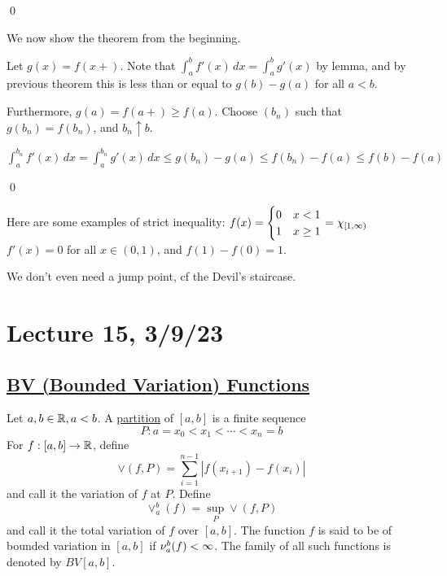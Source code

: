 \documentclass[x11names,reqno,14pt]{extarticle}
\begin{document}
\qed

We now show the theorem from the beginning. 

\proof

Let $g(x) = f(x+)$. Note that $\int_a^bf'(x)\,dx = \int_a^bg'(x)$ by lemma, and by previous theorem this is less than or equal to $g(b) - g(a)$ for all $a < b$. 

Furthermore, $g(a) = f(a+) \geq f(a)$. Choose $(b_n)$ such that $g(b_n) = f(b_n)$, and $b_n\uparrow b$. 

$\int_a^{b_n}f'(x)\,dx = \int_a^{b_n}g'(x)\,dx \leq g(b_n) - g(a) \leq f(b_n) - f(a) \leq f(b) - f(a)$

\qed

\exm 

Here are some examples of strict inequality: $f(x) = \begin{cases} 0 & x < 1 \\ 1 & x \geq 1 \end{cases} = \chi_{[1,\infty)}$
$f'(x) = 0$ for all $x \in (0, 1)$, and $f(1) - f(0) = 1$. 

We don't even need a jump point, cf the Devil's staircase. 

\section*{Lecture 15, 3/9/23}

\subsection*{\underline{BV (Bounded Variation) Functions}}


Let $a, b \in \mathbb{R}, a < b$. A \underline{partition} of $[a, b]$ is a finite sequence 
\[
P:a = x_0 < x_1 < \cdots < x_n = b
\]
For $f:[a,b]\to\mathbb{R}$, define 
\[
\vee(f, P) = \sum_{i=1}^{n - 1}|f(x_{i + 1}) - f(x_i)|
\]
and call it the variation of $f$ at $P$. Define
\[
\vee_a^b(f) = \sup_P\vee(f, P)
\]
and call it the total variation of $f$ over $[a, b]$. The function $f$ is said to be of bounded variation in $[a, b]$ if $\nu_a^b(f)<\infty$. The family of all such functions is denoted by $BV[a, b]$. 

\thm 
\end{document}
